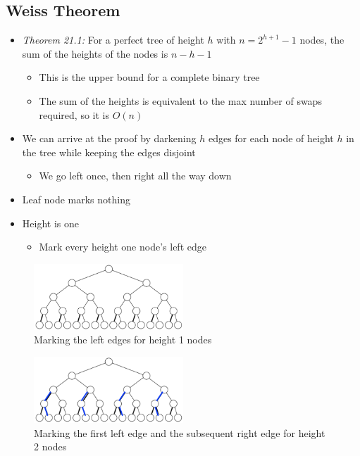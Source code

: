 \documentclass[
  10pt,
  english,
  letterpaper,
,tablecaptionabove
]{scrartcl}
\providecommand{\tightlist}{%
  \setlength{\itemsep}{0pt}\setlength{\parskip}{0pt}}
\begin{document}
\hypertarget{weiss-theorem}{%
\subsection{Weiss Theorem}\label{weiss-theorem}}

\begin{itemize}
\tightlist
\item
  \emph{Theorem 21.1:} For a perfect tree of height \(h\) with
  \(n = 2^{h+1} - 1\) nodes, the sum of the heights of the nodes is
  \(n-h-1\)

  \begin{itemize}
  \tightlist
  \item
    This is the upper bound for a complete binary tree
  \item
    The sum of the heights is equivalent to the max number of swaps
    required, so it is \(O(n)\)
  \end{itemize}
\item
  We can arrive at the proof by darkening \(h\) edges for each node of
  height \(h\) in the tree while keeping the edges disjoint

  \begin{itemize}
  \tightlist
  \item
    We go left once, then right all the way down
  \end{itemize}
\item
  Leaf node marks nothing
\item
  Height is one

  \begin{itemize}
  \tightlist
  \item
    Mark every height one node's left edge
  \end{itemize}
\end{itemize}

\begin{figure}
\centering
\includegraphics[width=0.5\textwidth,height=\textheight]{images/6.png}
\caption{Marking the left edges for height 1 nodes}
\end{figure}

\begin{figure}
\centering
\includegraphics[width=0.5\textwidth,height=\textheight]{images/7.png}
\caption{Marking the first left edge and the subsequent right edge for
height 2 nodes}
\end{figure}
\end{document}
